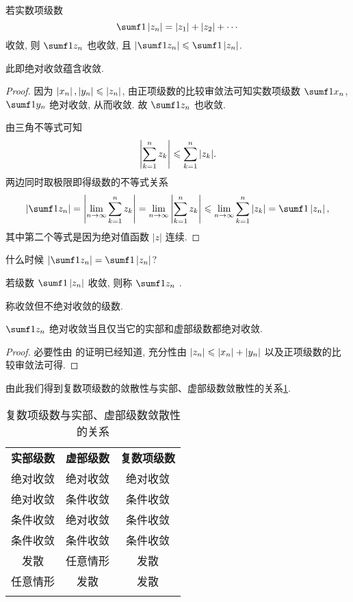 \begin{theorem}
  \label{thm:absolute-convergent}
  若实数项级数
  \[
    \sumf1 \abs{z_n}=|z_1|+|z_2|+\cdots
  \]
  收敛, 则 $\sumf1 z_n$ 也收敛, 且 $\abs{\sumf1 z_n}\le\sumf1 \abs{z_n}$.
\end{theorem}

此即绝对收敛蕴含收敛.

\begin{proof}
  因为 $\left|x_n\right|,\left|y_n\right|\leqslant\left|z_n\right|$, 由正项级数的比较审敛法可知实数项级数 $\sumf1 x_n$, $\sumf1 y_n$ 绝对收敛, 从而收敛.
  故 $\sumf1 z_n$ 也收敛.

  由三角不等式可知
  \[
    \left|\sum_{k=1}^n z_k\right|\leqslant \sum_{k=1}^n|z_k|.
  \]
  两边同时取极限即得级数的不等式关系
  \[
     \abs{\sumf1 z_n}
    =\abs{\lim_{n\ra\infty}\sum_{k=1}^n z_k}
    =\lim_{n\ra\infty}\abs{\sum_{k=1}^n z_k}
    \le\lim_{n\ra\infty}\sum_{k=1}^n|z_k|
    =\sumf1 \abs{z_n},
  \]
  其中第二个等式是因为绝对值函数 $|z|$ 连续.
\end{proof}

\begin{exercise}
  什么时候 $\abs{\sumf1 z_n}=\sumf1 \abs{z_n}$?
\end{exercise}

\begin{definition}
  \begin{enuma}
    \item 若级数 $\sumf1 \abs{z_n}$ 收敛, 则称 $\sumf1 z_n$ .
    \item 称收敛但不绝对收敛的级数.
  \end{enuma}
\end{definition}

\begin{theorem}
  $\sumf1 z_n$ 绝对收敛当且仅当它的实部和虚部级数都绝对收敛.
\end{theorem}

\begin{proof}
  必要性由 的证明已经知道,
  充分性由 $\left|z_n\right|\leqslant\left|x_n\right|+\left|y_n\right|$ 以及正项级数的比较审敛法可得.
\end{proof}

由此我们得到复数项级数的敛散性与实部、虚部级数敛散性的关系\ref{tab:convergent-re-im}.

\begin{table}[!htb]
  \centering
  \begin{tabular}{ccc} \topcolorrule
    \bf 实部级数&\bf 虚部级数&\bf 复数项级数\\ \topcolorrule
    绝对收敛&绝对收敛&绝对收敛\\ \midcolorrule
    绝对收敛&条件收敛&条件收敛\\ \midcolorrule
    条件收敛&绝对收敛&条件收敛\\ \midcolorrule
    条件收敛&条件收敛&条件收敛\\ \midcolorrule
    发散&任意情形&发散\\ \midcolorrule
    任意情形&发散&发散\\ \bottomcolorrule
  \end{tabular}
  \caption{复数项级数与实部、虚部级数敛散性的关系}
  \label{tab:convergent-re-im}
\end{table}

